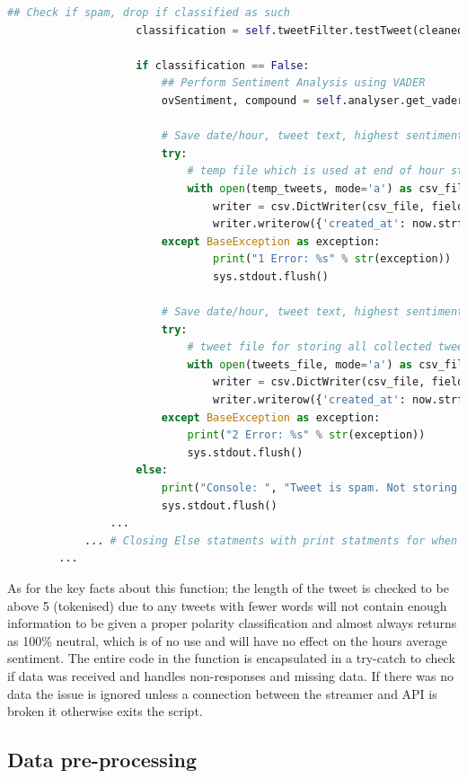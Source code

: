 \documentclass[oneside, 12pt]{article}
\begin{document}
\begin{lstlisting}[language=python, caption=Tweepy Stream: 'on\_data' method]
					## Check if spam, drop if classified as such
					classification = self.tweetFilter.testTweet(cleanedTweet)
			
					if classification == False:
						## Perform Sentiment Analysis using VADER
						ovSentiment, compound = self.analyser.get_vader_sentiment(cleanedTweet)
									
						# Save date/hour, tweet text, highest sentiment score from Positive or Negative and compound score
						try:
							# temp file which is used at end of hour streaming to average sentiment for hour
							with open(temp_tweets, mode='a') as csv_file:
								writer = csv.DictWriter(csv_file, fieldnames=temp_fieldnames)
								writer.writerow({'created_at': now.strftime("%Y-%m-%d %H:%M:%S"), 'tweet': cleanedTweet, 'sentiment': ovSentiment, 'compound': compound})
						except BaseException as exception:
								print("1 Error: %s" % str(exception))
								sys.stdout.flush()
									
						# Save date/hour, tweet text, highest sentiment score from Positive or Negative and compound score
						try:
							# tweet file for storing all collected tweets from every hour
							with open(tweets_file, mode='a') as csv_file:
								writer = csv.DictWriter(csv_file, fieldnames=fieldnames_tweet)
								writer.writerow({'created_at': now.strftime("%Y-%m-%d %H:%M:%S"), 'tweet': cleanedTweet, 'sentiment': ovSentiment, 'compound': compound})
						except BaseException as exception:
							print("2 Error: %s" % str(exception))
							sys.stdout.flush()
					else:
						print("Console: ", "Tweet is spam. Not storing tweet in dataset")
						sys.stdout.flush()
				...
			... # Closing Else statments with print statments for when the tweet doesn't meet criteria
		...
			\end{lstlisting}
			
			As for the key facts about this function; the length of the tweet is checked to be above 5 (tokenised) due to any tweets with fewer words will not contain enough information to be given a proper polarity classification and almost always returns as 100\% neutral, which is of no use and will have no effect on the hours average sentiment. The entire code in the function is encapsulated in a try-catch to check if data was received and handles non-responses and missing data. If there was no data the issue is ignored unless a connection between the streamer and API is broken it otherwise exits the script.	
			
		\newpage
		\subsection{Data pre-processing}\label{processing}
			
\end{document}
